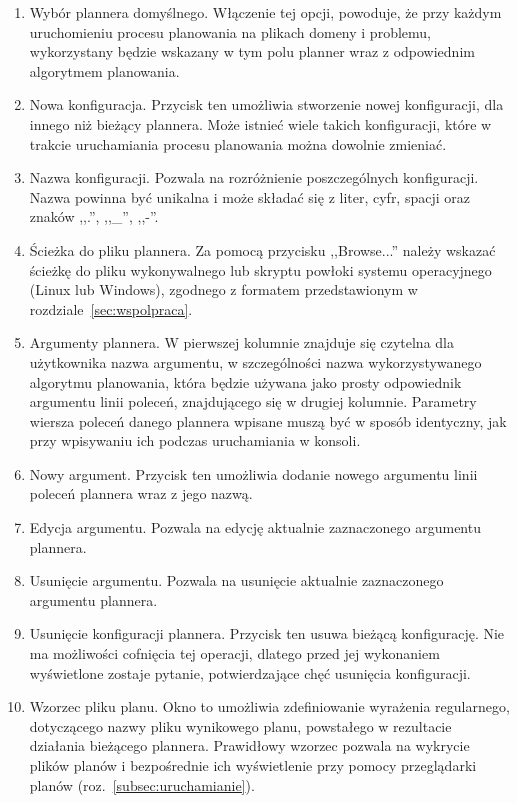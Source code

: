 \begin{enumerate}
\item Wybór plannera domyślnego. Włączenie tej opcji, powoduje, że przy każdym uruchomieniu procesu planowania na plikach domeny i problemu, wykorzystany będzie wskazany w tym polu planner wraz z odpowiednim algorytmem planowania.
\item Nowa konfiguracja. Przycisk ten umożliwia stworzenie nowej konfiguracji, dla innego niż bieżący plannera. Może istnieć wiele takich konfiguracji, które w trakcie uruchamiania procesu planowania można dowolnie zmieniać.
\item Nazwa konfiguracji. Pozwala na rozróżnienie poszczególnych konfiguracji. Nazwa powinna być unikalna i może składać się z liter, cyfr, spacji oraz znaków ,,.'', ,,\_'', ,,-''.
\item Ścieżka do pliku plannera. Za pomocą przycisku ,,Browse...'' należy wskazać ścieżkę do pliku wykonywalnego lub skryptu powłoki systemu operacyjnego (Linux lub Windows), zgodnego z formatem przedstawionym w rozdziale~\ref{sec:wspolpraca}.
\item Argumenty plannera. W pierwszej kolumnie znajduje się czytelna dla użytkownika nazwa argumentu, w szczególności nazwa wykorzystywanego algorytmu planowania, która będzie używana jako prosty odpowiednik argumentu linii poleceń, znajdującego się w drugiej kolumnie. Parametry wiersza poleceń danego plannera wpisane muszą być w sposób identyczny, jak przy wpisywaniu ich podczas uruchamiania w konsoli.
\item Nowy argument. Przycisk ten umożliwia dodanie nowego argumentu linii poleceń plannera wraz z jego nazwą.
\item Edycja argumentu. Pozwala na edycję aktualnie zaznaczonego argumentu plannera.
\item Usunięcie argumentu. Pozwala na usunięcie aktualnie zaznaczonego argumentu plannera.
\item Usunięcie konfiguracji plannera. Przycisk ten usuwa bieżącą konfigurację. Nie ma możliwości cofnięcia tej operacji, dlatego przed jej wykonaniem wyświetlone zostaje pytanie, potwierdzające chęć usunięcia konfiguracji.
\item Wzorzec pliku planu. Okno to umożliwia zdefiniowanie wyrażenia regularnego, dotyczącego nazwy pliku wynikowego planu, powstałego w rezultacie działania bieżącego plannera. Prawidłowy wzorzec pozwala na wykrycie plików planów i bezpośrednie ich wyświetlenie przy pomocy przeglądarki planów (roz.~\ref{subsec:uruchamianie}).
\begin{figure}[h!]

\end{figure}
\end{enumerate}
